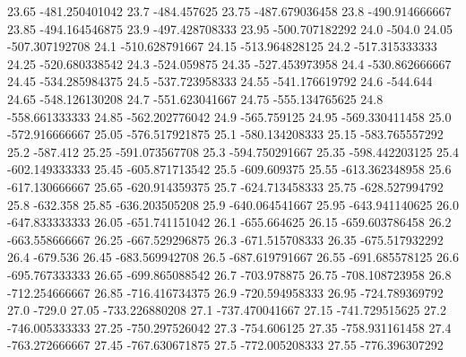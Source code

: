          23.65   -481.250401042
           23.7      -484.457625
          23.75   -487.679036458
           23.8   -490.914666667
          23.85   -494.164546875
           23.9   -497.428708333
          23.95   -500.707182292
           24.0           -504.0
          24.05   -507.307192708
           24.1   -510.628791667
          24.15   -513.964828125
           24.2   -517.315333333
          24.25   -520.680338542
           24.3      -524.059875
          24.35   -527.453973958
           24.4   -530.862666667
          24.45   -534.285984375
           24.5   -537.723958333
          24.55   -541.176619792
           24.6         -544.644
          24.65   -548.126130208
           24.7   -551.623041667
          24.75   -555.134765625
           24.8   -558.661333333
          24.85   -562.202776042
           24.9      -565.759125
          24.95   -569.330411458
           25.0   -572.916666667
          25.05   -576.517921875
           25.1   -580.134208333
          25.15   -583.765557292
           25.2         -587.412
          25.25   -591.073567708
           25.3   -594.750291667
          25.35   -598.442203125
           25.4   -602.149333333
          25.45   -605.871713542
           25.5      -609.609375
          25.55   -613.362348958
           25.6   -617.130666667
          25.65   -620.914359375
           25.7   -624.713458333
          25.75   -628.527994792
           25.8         -632.358
          25.85   -636.203505208
           25.9   -640.064541667
          25.95   -643.941140625
           26.0   -647.833333333
          26.05   -651.741151042
           26.1      -655.664625
          26.15   -659.603786458
           26.2   -663.558666667
          26.25   -667.529296875
           26.3   -671.515708333
          26.35   -675.517932292
           26.4         -679.536
          26.45   -683.569942708
           26.5   -687.619791667
          26.55   -691.685578125
           26.6   -695.767333333
          26.65   -699.865088542
           26.7      -703.978875
          26.75   -708.108723958
           26.8   -712.254666667
          26.85   -716.416734375
           26.9   -720.594958333
          26.95   -724.789369792
           27.0           -729.0
          27.05   -733.226880208
           27.1   -737.470041667
          27.15   -741.729515625
           27.2   -746.005333333
          27.25   -750.297526042
           27.3      -754.606125
          27.35   -758.931161458
           27.4   -763.272666667
          27.45   -767.630671875
           27.5   -772.005208333
          27.55   -776.396307292
